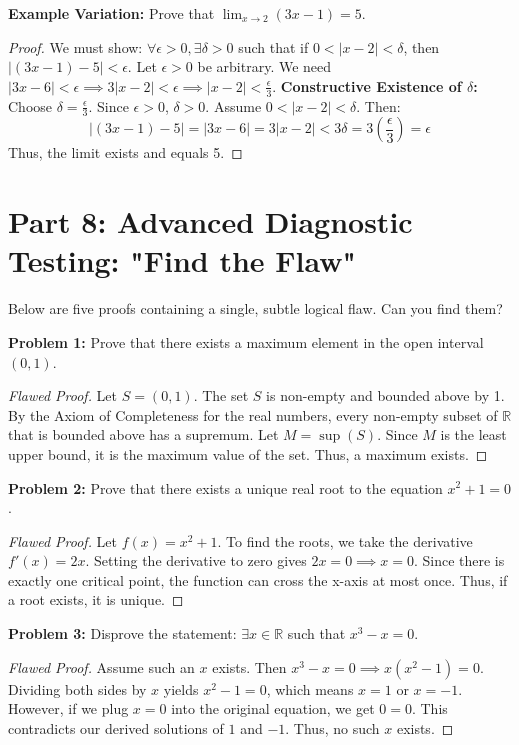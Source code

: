 \documentclass[11pt, a4paper]{article}
\theoremstyle{definition}
\theoremstyle{remark}
\newcommand{\R}{\mathbb{R}}
\begin{document}
\textbf{Example Variation:} Prove that $\lim_{x \to 2} (3x - 1) = 5$.
\begin{proof}
    We must show: $\forall \epsilon > 0, \exists \delta > 0$ such that if $0 < |x - 2| < \delta$, then $|(3x - 1) - 5| < \epsilon$.
    Let $\epsilon > 0$ be arbitrary. 
    We need $|3x - 6| < \epsilon \implies 3|x - 2| < \epsilon \implies |x - 2| < \frac{\epsilon}{3}$.
    \textbf{Constructive Existence of $\delta$:} Choose $\delta = \frac{\epsilon}{3}$. Since $\epsilon > 0$, $\delta > 0$.
    Assume $0 < |x - 2| < \delta$. Then:
    \[ |(3x - 1) - 5| = |3x - 6| = 3|x - 2| < 3\delta = 3\left(\frac{\epsilon}{3}\right) = \epsilon \]
    Thus, the limit exists and equals 5.
\end{proof}

\section{Part 8: Advanced Diagnostic Testing: "Find the Flaw"}

Below are five proofs containing a single, subtle logical flaw. Can you find them?

\textbf{Problem 1:} Prove that there exists a maximum element in the open interval $(0, 1)$.
\begin{proof}[Flawed Proof]
    Let $S = (0, 1)$. The set $S$ is non-empty and bounded above by 1. By the Axiom of Completeness for the real numbers, every non-empty subset of $\R$ that is bounded above has a supremum. Let $M = \sup(S)$. Since $M$ is the least upper bound, it is the maximum value of the set. Thus, a maximum exists.
\end{proof}

\textbf{Problem 2:} Prove that there exists a unique real root to the equation $x^2 + 1 = 0$.
\begin{proof}[Flawed Proof]
    Let $f(x) = x^2 + 1$. To find the roots, we take the derivative $f'(x) = 2x$. Setting the derivative to zero gives $2x = 0 \implies x = 0$. Since there is exactly one critical point, the function can cross the x-axis at most once. Thus, if a root exists, it is unique.
\end{proof}

\textbf{Problem 3:} Disprove the statement: $\exists x \in \R$ such that $x^3 - x = 0$.
\begin{proof}[Flawed Proof]
    Assume such an $x$ exists. Then $x^3 - x = 0 \implies x(x^2 - 1) = 0$. Dividing both sides by $x$ yields $x^2 - 1 = 0$, which means $x = 1$ or $x = -1$. However, if we plug $x=0$ into the original equation, we get $0 = 0$. This contradicts our derived solutions of $1$ and $-1$. Thus, no such $x$ exists.
\end{proof}
\end{document}
